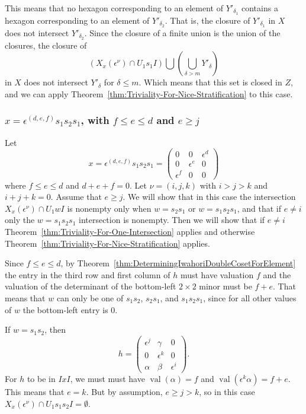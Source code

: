 \documentclass{amsart}
\theoremstyle{definition}
\def\e{\epsilon}
\def\val{\mathop{\mathrm{val}}}
\def\en{\e^{\nu}}
\def\X{X_x(\en)}
\begin{document}
  This means that no hexagon corresponding to an element of $Y'_{\delta_1}$
  contains a hexagon corresponding to an element of $Y'_{\delta_2}$.  That is,
  the closure of $Y'_{\delta_1}$ in $X$ does not intersect $Y'_{\delta_2}$.
  Since the closure of a finite union is the union of the closures, the closure
  of
  \begin{equation*}
    (\X \cap U_1 s_1 I) \bigcup \left(\bigcup_{\delta > m} Y'_\delta\right)
  \end{equation*}
  in $X$ does not intersect $Y'_\delta$ for $\delta \le m$.  Which means that
  this set is closed in $Z$, and we can apply
  Theorem~\ref{thm:Triviality-For-Nice-Stratification} to this case.
  
  \subsubsection{$x = \e^{(d,e,f)} s_1s_2s_1$, with $f \le e \le d$ and $e \ge j$}
  Let
  \begin{equation}
    x = \e^{(d, e, f)}s_1s_2s_1 = \begin{pmatrix}
        0 & 0 & \e^d  \\
        0 & \e^e & 0 \\
         \e^f & 0 & 0
      \end{pmatrix}
  \end{equation}
  where $f \le e \le d$ and $d + e + f = 0$.  Let $\nu = (i,j,k)$ with $i > j >
  k$ and $i + j + k = 0$.  Assume that $e \ge j$.  We will show that in this
  case the intersection $\X \cap U_1wI$ is nonempty only when $w = s_2s_1$ or $w
  =s_1s_2s_1$, and that if $e \neq i$ only the $w = s_1 s_2 s_1$ intersection
  is nonempty.  Then we will show that if $e \neq i$
  Theorem~\ref{thm:Triviality-For-One-Intersection} applies and otherwise
  Theorem~\ref{thm:Triviality-For-Nice-Stratification} applies.

  Since $f \le e \le d$, by
  Theorem~\ref{thm:DeterminingIwahoriDoubleCosetForElement} the entry in the
  third row and first column of $h$ must have valuation $f$ and the valuation
  of the determinant of the bottom-left $2 \times 2$ minor must be $f + e$.
  That means that $w$ can only be one of $s_1s_2$, $s_2s_1$, and $s_1s_2s_1$,
  since for all other values of $w$ the bottom-left entry is 0.

  If $w = s_1s_2$, then
  \begin{equation*}
    h = \begin{pmatrix}
      \e^j & \gamma & 0 \\
      0 & \e^k & 0 \\
      \alpha & \beta & \e^i
    \end{pmatrix}.
  \end{equation*}
  For $h$ to be in $IxI$, we must must have $\val(\alpha) = f$ and
  $\val(\e^k\alpha) = f + e$.  This means that $e = k$.  But by assumption, $e
  \ge j > k$, so in this case $\X \cap U_1 s_1 s_2 I = \emptyset$.
\end{document}
